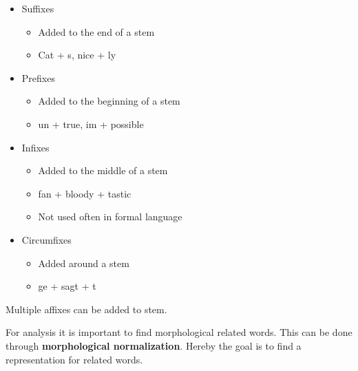 \documentclass[
../../NLP4W_Summary.tex,
]
{subfiles}
\begin{document}
\begin{defbox}
    \begin{itemize}
        \item Suffixes
        \begin{itemize}
            \item Added to the end of a stem
            \item Cat + s, nice + ly
        \end{itemize}
        \item Prefixes 
        \begin{itemize}
            \item Added to the beginning of a stem
            \item un + true, im + possible
        \end{itemize}
        \item Infixes
        \begin{itemize}
            \item Added to the middle of a stem
            \item fan + bloody + tastic
            \item Not used often in formal language
        \end{itemize}
        \item Circumfixes
        \begin{itemize}
            \item Added around a stem
            \item ge + sagt + t
        \end{itemize}
    \end{itemize}
\end{defbox}

Multiple affixes can be added to stem.

For analysis it is important to find morphological related words. This can be done through \textbf{morphological normalization}. Hereby the goal is to find a representation for related words.
\end{document}
